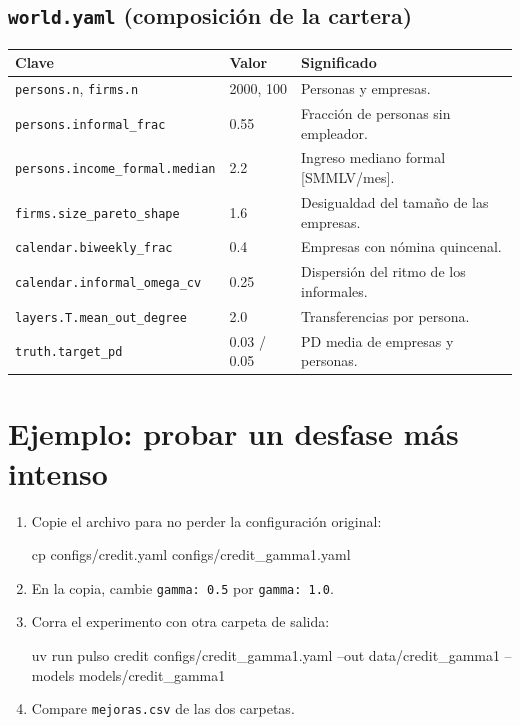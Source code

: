 \subsection*{\texttt{world.yaml} (composición de la cartera)}
\begin{longtable}{L{0.34\textwidth}L{0.14\textwidth}L{0.44\textwidth}}
\toprule
\textbf{Clave} & \textbf{Valor} & \textbf{Significado} \\
\midrule
\endhead
\texttt{persons.n}, \texttt{firms.n} & 2000, 100 & Personas y empresas. \\
\texttt{persons.informal\_frac} & 0.55 & Fracción de personas sin empleador. \\
\texttt{persons.income\_formal.median} & 2.2 & Ingreso mediano formal [SMMLV/mes]. \\
\texttt{firms.size\_pareto\_shape} & 1.6 & Desigualdad del tamaño de las empresas. \\
\texttt{calendar.biweekly\_frac} & 0.4 & Empresas con nómina quincenal. \\
\texttt{calendar.informal\_omega\_cv} & 0.25 & Dispersión del ritmo de los informales. \\
\texttt{layers.T.mean\_out\_degree} & 2.0 & Transferencias por persona. \\
\texttt{truth.target\_pd} & 0.03 / 0.05 & PD media de empresas y personas. \\
\bottomrule
\end{longtable}

\section{Ejemplo: probar un desfase más intenso}
\begin{enumerate}
\item Copie el archivo para no perder la configuración original:
\begin{terminal}
cp configs/credit.yaml configs/credit_gamma1.yaml
\end{terminal}
\item En la copia, cambie \texttt{gamma: 0.5} por \texttt{gamma: 1.0}.
\item Corra el experimento con otra carpeta de salida:
\begin{terminal}
uv run pulso credit configs/credit_gamma1.yaml --out data/credit_gamma1 --models models/credit_gamma1
\end{terminal}
\item Compare \texttt{mejoras.csv} de las dos carpetas.
\end{enumerate}

